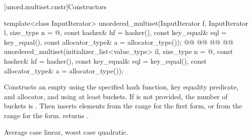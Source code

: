 \documentclass{wg21}
\begin{document}
[unord.multiset.cnstr]{Constructors}


%
\begin{itemdecl}
template<class InputIterator>
unordered_multiset(InputIterator f, InputIterator l,
    size_type n = @\seebelow@,
    const hasher& hf = hasher(),
    const key_equal& eql = key_equal(),
    const allocator_type& a = allocator_type());
@@
@@
    @@
    @@
unordered_multiset(initializer_list<value_type> il,
    size_type n = @\seebelow@,
    const hasher& hf = hasher(),
    const key_equal& eql = key_equal(),
    const allocator_type& a = allocator_type());
\end{itemdecl}

\begin{itemdescr}
    \pnum
    \effects
    Constructs an empty  using the
    specified hash function, key equality predicate, and allocator, and
    using at least  buckets. If  is not
    provided, the number of buckets is . Then
    inserts elements from the range 
    for the first form,  or from the range
     for the  form.
     returns .
    
    \pnum
    \complexity
    Average case linear, worst case quadratic.
\end{itemdescr}
\end{document}
